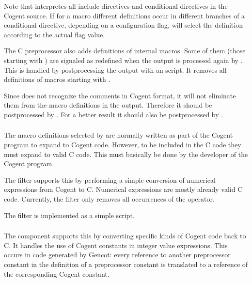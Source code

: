 Note that  interpretes all include directives and conditional directives in the Cogent source. If for a macro
different definitions occur in different branches of a conditional directive, depending on a configuration flag,
 will select the definition according to the actual flag value.

The C preprocessor also adds definitions of internal macros. Some of them (those starting with ) are 
signaled as redefined when the output is processed again by . This is handled
by postprocessing the output with an  script. It removes all definitions of macros starting with .

Since  does not recognize the comments in Cogent format, it will not eliminate them from the macro definitions 
in the output. Therefore it should be postprocessed by . For a better result it should also 
be postprocessed by .

\subsubsection{}

The macro definitions selected by  are normally written as part of the Cogent program to expand 
to Cogent code. However, to be included in the C code they must expand to valid C code. This must basically be done
by the developer of the Cogent program. 

The filter  supports this by performing a simple conversion of numerical expressions from Cogent
to C. Numerical expressions are mostly already valid C code. Currently, the filter only removes all occurrences
of the  operator.

The filter is implemented as a simple  script.

\subsubsection{}

The  component supports this by converting specific kinds of Cogent code back to C. It handles 
the use of Cogent constants in integer value expressions. This occurs in code generated by Gencot: every reference 
to another preprocessor constant in the definition of a preprocessor constant is translated to a reference of the 
corresponding Cogent constant.

